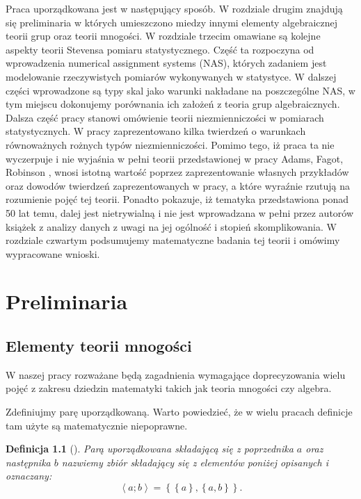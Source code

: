 \documentclass[12pt,a4paper]{report}
\newtheorem{definition}{Definicja}[chapter]
\newcommand{\parauporzadkowana}[2]{\left\langle {#1}; {#2} \right\rangle}
\newcommand{\zbior}[1]{\left\lbrace {#1} \right\rbrace }
\begin{document}
Praca uporządkowana jest w następujący sposób. W rozdziale drugim znajdują się preliminaria w których umieszczono miedzy innymi elementy algebraicznej teorii grup oraz teorii mnogości. W rozdziale trzecim omawiane są kolejne aspekty teorii Stevensa pomiaru statystycznego. Część ta rozpoczyna od wprowadzenia numerical assignment systems (NAS), których zadaniem jest modelowanie rzeczywistych pomiarów wykonywanych w statystyce. W dalszej części wprowadzone są typy skal jako warunki nakładane na poszczególne NAS, w tym miejscu dokonujemy porównania ich założeń z teoria grup algebraicznych. Dalsza część pracy stanowi omówienie teorii niezmienniczości w pomiarach statystycznych. W pracy zaprezentowano kilka twierdzeń o warunkach równoważnych rożnych typów niezmienniczości. Pomimo tego, iż praca ta nie wyczerpuje i nie wyjaśnia w pełni teorii przedstawionej w pracy Adams, Fagot, Robinson {\citep{adams1965theory}}, wnosi istotną wartość poprzez zaprezentowanie własnych przykładów oraz dowodów twierdzeń zaprezentowanych w pracy, a które wyraźnie rzutują na rozumienie pojęć tej teorii. Ponadto pokazuje, iż tematyka przedstawiona ponad 50 lat temu, dalej jest nietrywialną i nie jest wprowadzana w pełni przez autorów książek z analizy danych z uwagi na jej ogólność i stopień skomplikowania. W rozdziale czwartym podsumujemy  matematyczne badania tej teorii i omówimy wypracowane wnioski.

\chapter{Preliminaria}


\section{Elementy teorii mnogości}
W naszej pracy rozważane będą zagadnienia wymagające doprecyzowania wielu pojęć z zakresu dziedzin matematyki takich jak teoria mnogości czy algebra. 


Zdefiniujmy parę uporządkowaną. Warto powiedzieć, że w wielu pracach definicje tam użyte są matematycznie niepoprawne.

\begin{definition}[{\citep[Sec 3.3]{kuratowski1966wstkep}}]
Parą uporządkowana składającą się z poprzednika $a$ oraz następnika $b$ nazwiemy zbiór składający się z elementów poniżej opisanych i oznaczany:
\begin{equation*}
\parauporzadkowana{a}{b}=\zbior{\zbior{a}, \zbior{a,b}}.
\end{equation*}

\end{definition}
\end{document}
